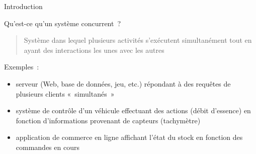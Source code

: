 \def\inc{inc1-intro}

\def\cpudb{Stanford CPU database -- \url {http://cpudb.stanford.edu/}}




\begin {frame} {Introduction}

    Qu'est-ce qu'un système concurrent~?

    \begin {quote}
	Système dans lequel plusieurs activités s'exécutent
	simultanément tout en ayant des interactions les unes avec
	les autres

    \end {quote}

    \vspace* {3mm}

    Exemples~:

    \begin {itemize}
	\item serveur (Web, base de données, jeu, etc.) répondant à
	    des requêtes de plusieurs clients «~simultanés~»
	\item système de contrôle d'un véhicule effectuant des actions
	    (débit d'essence) en fonction d'informations provenant de
	    capteurs (tachymètre)
	\item application de commerce en ligne affichant l'état du
	    stock en fonction des commandes en cours

    \end {itemize}

\end {frame}

